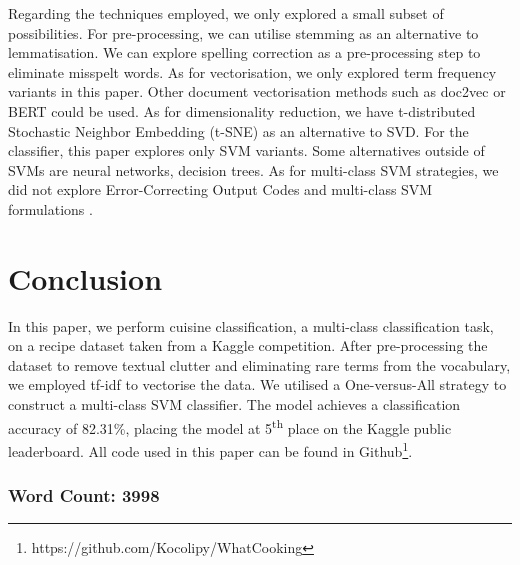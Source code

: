 \documentclass{article}
\begin{document}
Regarding the techniques employed, we only explored a small subset of possibilities. For pre-processing, we can utilise stemming as an alternative to lemmatisation. We can explore spelling correction as a pre-processing step to eliminate misspelt words. As for vectorisation, we only explored term frequency variants in this paper. Other document vectorisation methods such as doc2vec or BERT could be used. As for dimensionality reduction, we have t-distributed Stochastic Neighbor Embedding (t-SNE) as an alternative to SVD. For the classifier, this paper explores only SVM variants. Some alternatives outside of SVMs are neural networks, decision trees. As for multi-class SVM strategies, we did not explore Error-Correcting Output Codes and multi-class SVM formulations \cite{crammer}.

\section{Conclusion}
In this paper, we perform cuisine classification, a multi-class classification task, on a recipe dataset taken from a Kaggle competition. After pre-processing the dataset to remove textual clutter and eliminating rare terms from the vocabulary, we employed tf-idf to vectorise the data. We utilised a One-versus-All strategy to construct a multi-class SVM classifier. The model achieves a classification accuracy of 82.31\%, placing the model at 5\textsuperscript{th} place on the Kaggle public leaderboard. All code used in this paper can be found in Github\footnote{https://github.com/Kocolipy/WhatCooking}.

\subsubsection*{Word Count: 3998}

\newpage



\end{document}

